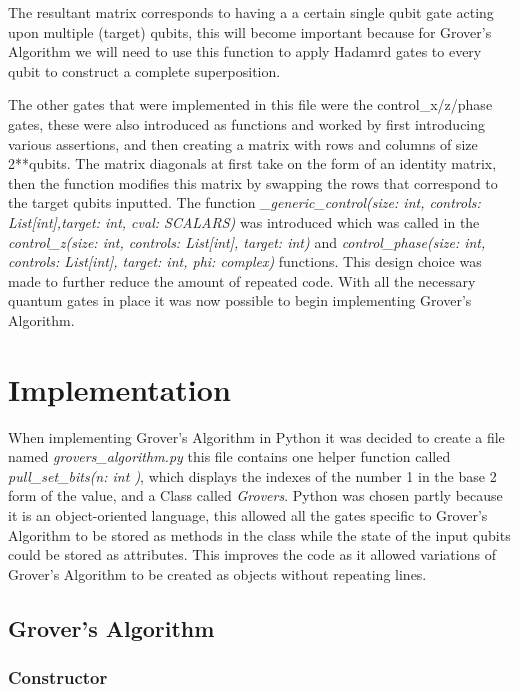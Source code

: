 \documentclass{article}
\begin{document}
The resultant matrix corresponds to having a a certain single qubit gate acting upon multiple (target) qubits, this will become important because for Grover's Algorithm we will need to use this function to apply Hadamrd gates to every qubit to construct a complete superposition. 

The other gates that were implemented in this file were the control\_x/z/phase gates, these were also introduced as functions and worked by first introducing various assertions, and then creating a matrix with rows and columns of size 2**qubits. The matrix diagonals at first take on the form of an identity matrix, then the function modifies this matrix by swapping the rows that correspond to the target qubits inputted. The function \textit{\_generic\_control(size: int, controls: List[int],target: int, cval: SCALARS)} was introduced which was called in the \textit{ control\_z(size: int, controls: List[int], target: int) } and \textit{control\_phase(size: int, controls: List[int], target: int, phi: complex)} functions. This design choice was made to further reduce the amount of repeated code. With all the necessary quantum gates in place it was now possible to begin implementing Grover’s Algorithm.

\pagebreak

\section{Implementation}

When implementing Grover's Algorithm in Python it was decided to create a file named \textit{grovers\_algorithm.py} this file contains one helper function called \textit{ pull\_set\_bits(n: int )}, which displays the indexes of the number 1 in the base 2 form of the value, and a Class called \textit{Grovers}. Python was chosen partly because it is an object-oriented language, this allowed all the gates specific to Grover’s Algorithm to be stored as methods in the class while the state of the input qubits could be stored as attributes. This improves the code as it allowed variations of Grover's Algorithm to be created as objects without repeating lines. 
\subsection{Grover's Algorithm} \label{Implement Grovers}
\subsubsection{Constructor} \label{constructor}
\end{document}
